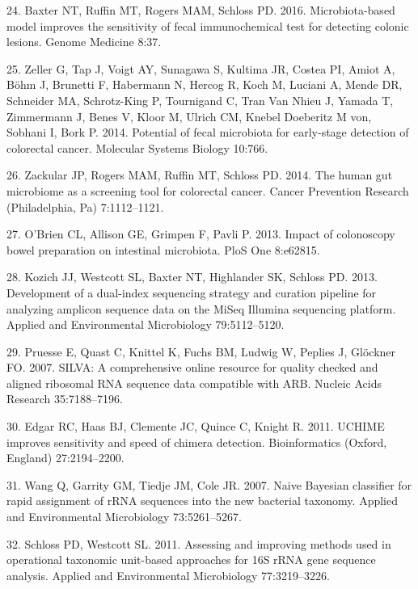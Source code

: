 \documentclass[12pt,]{article}
\begin{document}
\hypertarget{ref-baxter_microbiota-based_2016}{}
24. Baxter NT, Ruffin MT, Rogers MAM, Schloss PD. 2016. Microbiota-based
model improves the sensitivity of fecal immunochemical test for
detecting colonic lesions. Genome Medicine 8:37.

\hypertarget{ref-zeller_potential_2014}{}
25. Zeller G, Tap J, Voigt AY, Sunagawa S, Kultima JR, Costea PI, Amiot
A, Böhm J, Brunetti F, Habermann N, Hercog R, Koch M, Luciani A, Mende
DR, Schneider MA, Schrotz-King P, Tournigand C, Tran Van Nhieu J, Yamada
T, Zimmermann J, Benes V, Kloor M, Ulrich CM, Knebel Doeberitz M von,
Sobhani I, Bork P. 2014. Potential of fecal microbiota for early-stage
detection of colorectal cancer. Molecular Systems Biology 10:766.

\hypertarget{ref-zackular_human_2014}{}
26. Zackular JP, Rogers MAM, Ruffin MT, Schloss PD. 2014. The human gut
microbiome as a screening tool for colorectal cancer. Cancer Prevention
Research (Philadelphia, Pa) 7:1112--1121.

\hypertarget{ref-obrien_impact_2013}{}
27. O'Brien CL, Allison GE, Grimpen F, Pavli P. 2013. Impact of
colonoscopy bowel preparation on intestinal microbiota. PloS One
8:e62815.

\hypertarget{ref-kozich_development_2013}{}
28. Kozich JJ, Westcott SL, Baxter NT, Highlander SK, Schloss PD. 2013.
Development of a dual-index sequencing strategy and curation pipeline
for analyzing amplicon sequence data on the MiSeq Illumina sequencing
platform. Applied and Environmental Microbiology 79:5112--5120.

\hypertarget{ref-pruesse_silva_2007}{}
29. Pruesse E, Quast C, Knittel K, Fuchs BM, Ludwig W, Peplies J,
Glöckner FO. 2007. SILVA: A comprehensive online resource for quality
checked and aligned ribosomal RNA sequence data compatible with ARB.
Nucleic Acids Research 35:7188--7196.

\hypertarget{ref-edgar_uchime_2011}{}
30. Edgar RC, Haas BJ, Clemente JC, Quince C, Knight R. 2011. UCHIME
improves sensitivity and speed of chimera detection. Bioinformatics
(Oxford, England) 27:2194--2200.

\hypertarget{ref-wang_naive_2007}{}
31. Wang Q, Garrity GM, Tiedje JM, Cole JR. 2007. Naive Bayesian
classifier for rapid assignment of rRNA sequences into the new bacterial
taxonomy. Applied and Environmental Microbiology 73:5261--5267.

\hypertarget{ref-schloss_assessing_2011}{}
32. Schloss PD, Westcott SL. 2011. Assessing and improving methods used
in operational taxonomic unit-based approaches for 16S rRNA gene
sequence analysis. Applied and Environmental Microbiology 77:3219--3226.
\end{document}
